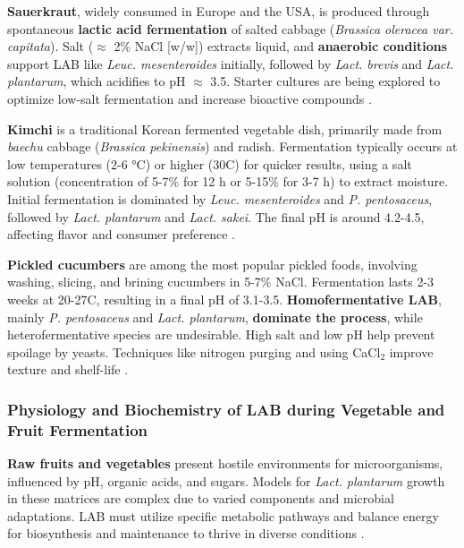 \textbf{Sauerkraut}, widely consumed in Europe and the USA, is produced through spontaneous \textbf{lactic acid fermentation} of salted cabbage (\textit{Brassica oleracea var. capitata}). Salt ($\approx$ 2\% NaCl [w/w]) extracts liquid, and \textbf{anaerobic conditions} support LAB like \textit{Leuc. mesenteroides} initially, followed by \textit{Lact. brevis} and \textit{Lact. plantarum}, which acidifies to pH $\approx$ 3.5. Starter cultures are being explored to optimize low-salt fermentation and increase bioactive compounds \cite*{L8-VegFruit}.

\textbf{Kimchi} is a traditional Korean fermented vegetable dish, primarily made from \textit{baechu} cabbage (\textit{Brassica pekinensis}) and radish. Fermentation typically occurs at low temperatures (2-6 °C) or higher (30\textdegree C) for quicker results, using a salt solution (concentration of 5-7\% for 12 h or 5-15\% for 3-7 h) to extract moisture. Initial fermentation is dominated by \textit{Leuc. mesenteroides} and \textit{P. pentosaceus}, followed by \textit{Lact. plantarum} and \textit{Lact. sakei}. The final pH is around 4.2-4.5, affecting flavor and consumer preference \cite*{L8-VegFruit}.

\textbf{Pickled cucumbers} are among the most popular pickled foods, involving washing, slicing, and brining cucumbers in 5-7\% NaCl. Fermentation lasts 2-3 weeks at 20-27\textdegree C, resulting in a final pH of 3.1-3.5. \textbf{Homofermentative LAB}, mainly \textit{P. pentosaceus} 
and \textit{Lact. plantarum}, \textbf{dominate the process}, while heterofermentative species are undesirable. High salt and low pH help prevent spoilage by yeasts. Techniques like nitrogen purging and using CaCl$_2$ improve texture and shelf-life \cite*{L8-VegFruit}.

\subsubsection{Physiology and Biochemistry of LAB during Vegetable and Fruit Fermentation}
\textbf{Raw fruits and vegetables} present hostile environments for microorganisms, influenced by pH, organic acids, and sugars. Models for \textit{Lact. plantarum} growth in these matrices are complex due to varied components and microbial adaptations. LAB must utilize specific metabolic pathways and balance energy for biosynthesis and maintenance to thrive in diverse conditions \cite*{L8-VegFruit}.

